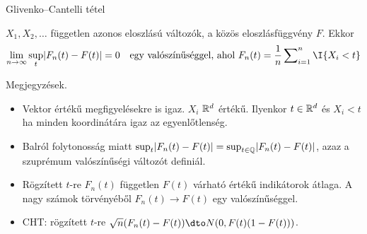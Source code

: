 \documentclass[aspectratio=169,notheorems,9pt,\option]{beamer}
\begin{document}
\begin{frame}{Glivenko--Cantelli tétel}
  \begin{theorem}
    $X_1,X_2,\dots$ független azonos eloszlású változók, a közös
    eloszlásfüggvény $F$.
    Ekkor
    \begin{displaymath}
      \lim_{n\to\infty}\sup_t \abs*{F_n (t)-F (t)}=0\quad
      \text{egy valószínűséggel, ahol $F_n(t)=\frac1n\sum\nolimits_{i=1}^n \I{X_i<t}$} %
    \end{displaymath}
  \end{theorem}
  \continue
  Megjegyzések.
  \begin{itemize}
  \item Vektor értékű megfigyelésekre is igaz. $X_i$ $\mathbb{R}^d$
    értékű. Ilyenkor $t\in\mathbb{R}^d$ és $X_i<t$ ha minden koordinátára
    igaz az egyenlőtlenség.
  \item Balról folytonosság miatt $\sup_{t}\abs*{F_n (t)-F (t)}=\sup_{t\in\Q}\abs*{F_n (t)-F
      (t)}$, azaz a szuprémum valószínűségi változót definiál.
  \item Rögzített $t$-re $F_n (t)$ független $F (t)$ várható értékű
    indikátorok átlaga. A nagy számok törvényéből $F_n (t)\to F (t)$ egy
    valószínűséggel.
    
  \item CHT: rögzített $t$-re $\sqrt{n}(F_n (t)-F (t))\dto N (0,F (t) (1-F (t)))$.
  \end{itemize}
\end{frame}
\end{document}
